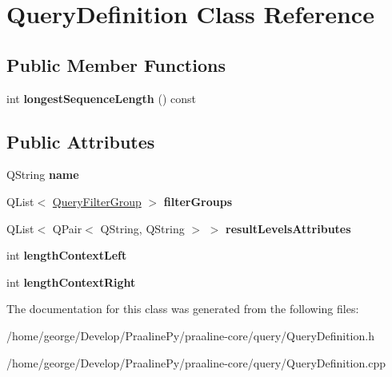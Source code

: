\hypertarget{class_query_definition}{}\section{Query\+Definition Class Reference}
\label{class_query_definition}
\subsection*{Public Member Functions}
\begin{DoxyCompactItemize}
\item 
\mbox{\label{class_query_definition_a1811d0c9bbbc7eaeb3f1b396d1958c66}} 
int {\bfseries longest\+Sequence\+Length} () const
\end{DoxyCompactItemize}
\subsection*{Public Attributes}
\begin{DoxyCompactItemize}
\item 
\mbox{\label{class_query_definition_a0813362525943881edb96bae1af5eba9}} 
Q\+String {\bfseries name}
\item 
\mbox{\label{class_query_definition_a60ffdd574564f3b9e02ee327a885eaf4}} 
Q\+List$<$ \hyperlink{class_query_filter_group}{Query\+Filter\+Group} $>$ {\bfseries filter\+Groups}
\item 
\mbox{\label{class_query_definition_ac5e9c07c044c18882f7d7e0373bd78c9}} 
Q\+List$<$ Q\+Pair$<$ Q\+String, Q\+String $>$ $>$ {\bfseries result\+Levels\+Attributes}
\item 
\mbox{\label{class_query_definition_ad9140ea191575a29d51b941d760c314e}} 
int {\bfseries length\+Context\+Left}
\item 
\mbox{\label{class_query_definition_a7a4722f0fe66a68cf877bd39d9da7ef0}} 
int {\bfseries length\+Context\+Right}
\end{DoxyCompactItemize}


The documentation for this class was generated from the following files\+:\begin{DoxyCompactItemize}
\item 
/home/george/\+Develop/\+Praaline\+Py/praaline-\/core/query/Query\+Definition.\+h\item 
/home/george/\+Develop/\+Praaline\+Py/praaline-\/core/query/Query\+Definition.\+cpp\end{DoxyCompactItemize}
